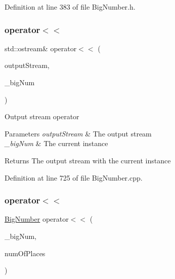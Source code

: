 Definition at line 383 of file Big\+Number.\+h.

\mbox{\label{class_big_nums_1_1_big_number_a47e2ad103bf98d5fecb7a0ff01d36e60}} 
\subsubsection{\texorpdfstring{operator$<$$<$}{operator<<}\hspace{0.1cm}{\footnotesize\ttfamily [1/2]}}
{\footnotesize\ttfamily std\+::ostream\& operator$<$$<$ (\begin{DoxyParamCaption}\item[{std\+::ostream \&}]{output\+Stream,  }\item[{const \mbox{\hyperlink{class_big_nums_1_1_big_number}{Big\+Number}} \&}]{\+\_\+big\+Num }\end{DoxyParamCaption})\hspace{0.3cm}{\ttfamily [friend]}}

Output stream operator 
\begin{DoxyParams}{Parameters}
{\em output\+Stream} & The output stream \\
\hline
{\em \+\_\+big\+Num} & The current instance \\
\hline
\end{DoxyParams}
\begin{DoxyReturn}{Returns}
The output stream with the current instance 
\end{DoxyReturn}


Definition at line 725 of file Big\+Number.\+cpp.

\mbox{\label{class_big_nums_1_1_big_number_ab6d6f57915676119fc27d509ffbc7aaa}} 
\subsubsection{\texorpdfstring{operator$<$$<$}{operator<<}\hspace{0.1cm}{\footnotesize\ttfamily [2/2]}}
{\footnotesize\ttfamily \mbox{\hyperlink{class_big_nums_1_1_big_number}{Big\+Number}} operator$<$$<$ (\begin{DoxyParamCaption}\item[{const \mbox{\hyperlink{class_big_nums_1_1_big_number}{Big\+Number}} \&}]{\+\_\+big\+Num,  }\item[{int}]{num\+Of\+Places }\end{DoxyParamCaption})\hspace{0.3cm}{\ttfamily [friend]}}

